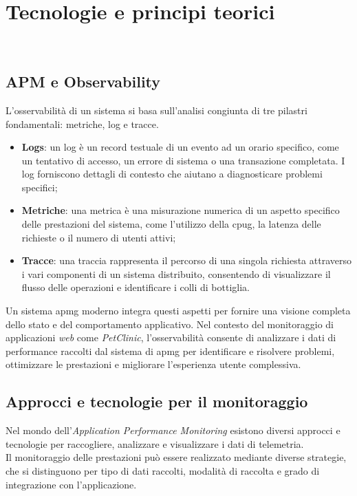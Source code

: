 \chapter{Tecnologie e principi teorici}
\label{cap:tecnologie-principi-teorici}

\\

\section{APM e Observability}
\label{sec:apm-observability}
L'osservabilità di un sistema si basa sull'analisi congiunta di tre pilastri fondamentali: metriche, log e tracce. 
\begin{itemize}
    \item \textbf{Logs}: un log è un record testuale di un evento ad un orario specifico, come un tentativo di accesso, un errore di sistema o una transazione completata. I log forniscono dettagli di contesto che aiutano a diagnosticare problemi specifici;
    \item \textbf{Metriche}: una metrica è una misurazione numerica di un aspetto specifico delle prestazioni del sistema, come l'utilizzo della \gls{cpug}, la latenza delle richieste o il numero di utenti attivi;
    \item \textbf{Tracce}: una traccia rappresenta il percorso di una singola richiesta attraverso i vari componenti di un sistema distribuito, consentendo di visualizzare il flusso delle operazioni e identificare i colli di bottiglia.
\end{itemize}
Un sistema \gls{apmg} moderno integra questi aspetti per fornire una visione completa dello stato e del comportamento applicativo. Nel contesto del monitoraggio di applicazioni \emph{web} come \emph{PetClinic}, l'osservabilità consente di analizzare i dati di performance raccolti dal sistema di \gls{apmg} per identificare e risolvere problemi, ottimizzare le prestazioni e migliorare l'esperienza utente complessiva.


\section{Approcci e tecnologie per il monitoraggio}
\label{sec:approcci-tecnologie-monitoraggio}
Nel mondo dell'\emph{Application Performance Monitoring} esistono diversi approcci e tecnologie per raccogliere, analizzare e visualizzare i dati di telemetria. \\
Il monitoraggio delle prestazioni può essere realizzato mediante diverse strategie, che si distinguono per tipo di dati raccolti, modalità di raccolta e grado di integrazione con l'applicazione.


